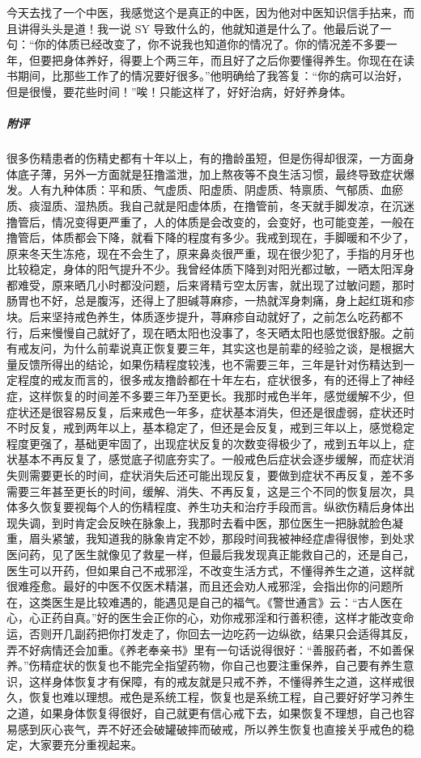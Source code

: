 \begin{case}
    今天去找了一个中医，我感觉这个是真正的中医，因为他对中医知识信手拈来，而且讲得头头是道！我一说 SY 导致什么的，他就知道是什么了。他最后说了一句：“你的体质已经改变了，你不说我也知道你的情况了。你的情况差不多要一年，但要把身体养好，得要上个两三年，而且好了之后你要懂得养生。你现在在读书期间，比那些工作了的情况要好很多。”他明确给了我答复：“你的病可以治好，但是很慢，要花些时间！”唉！只能这样了，好好治病，好好养身体。
    \subparagraph{附评} 很多伤精患者的伤精史都有十年以上，有的撸龄虽短，但是伤得却很深，一方面身体底子薄，另外一方面就是狂撸滥泄，加上熬夜等不良生活习惯，最终导致症状爆发。人有九种体质：平和质、气虚质、阳虚质、阴虚质、特禀质、气郁质、血瘀质、痰湿质、湿热质。我自己就是阳虚体质，在撸管前，冬天就手脚发凉，在沉迷撸管后，情况变得更严重了，人的体质是会改变的，会变好，也可能变差，一般在撸管后，体质都会下降，就看下降的程度有多少。我戒到现在，手脚暖和不少了，原来冬天生冻疮，现在不会生了，原来鼻炎很严重，现在很少犯了，手指的月牙也比较稳定，身体的阳气提升不少。我曾经体质下降到对阳光都过敏，一晒太阳浑身都难受，原来晒几小时都没问题，后来肾精亏空太厉害，就出现了过敏问题，那时肠胃也不好，总是腹泻，还得上了胆碱荨麻疹，一热就浑身刺痛，身上起红斑和疹块。后来坚持戒色养生，体质逐步提升，荨麻疹自动就好了，之前怎么吃药都不行，后来慢慢自己就好了，现在晒太阳也没事了，冬天晒太阳也感觉很舒服。之前有戒友问，为什么前辈说真正恢复要三年，其实这也是前辈的经验之谈，是根据大量反馈所得出的结论，如果伤精程度较浅，也不需要三年，三年是针对伤精达到一定程度的戒友而言的，很多戒友撸龄都在十年左右，症状很多，有的还得上了神经症，这样恢复的时间差不多要三年乃至更长。我那时戒色半年，感觉缓解不少，但症状还是很容易反复，后来戒色一年多，症状基本消失，但还是很虚弱，症状还时不时反复，戒到两年以上，基本稳定了，但还是会反复，戒到三年以上，感觉稳定程度更强了，基础更牢固了，出现症状反复的次数变得极少了，戒到五年以上，症状基本不再反复了，感觉底子彻底夯实了。一般戒色后症状会逐步缓解，而症状消失则需要更长的时间，症状消失后还可能出现反复，要做到症状不再反复，差不多需要三年甚至更长的时间，缓解、消失、不再反复，这是三个不同的恢复层次，具体多久恢复要视每个人的伤精程度、养生功夫和治疗手段而言。纵欲伤精后身体出现失调，到时肯定会反映在脉象上，我那时去看中医，那位医生一把脉就脸色凝重，眉头紧皱，我知道我的脉象肯定不妙，那段时间我被神经症虐得很惨，到处求医问药，见了医生就像见了救星一样，但最后我发现真正能救自己的，还是自己，医生可以开药，但如果自己不戒邪淫，不改变生活方式，不懂得养生之道，这样就很难痊愈。最好的中医不仅医术精湛，而且还会劝人戒邪淫，会指出你的问题所在，这类医生是比较难遇的，能遇见是自己的福气。《警世通言》云：“古人医在心，心正药自真。”好的医生会正你的心，劝你戒邪淫和行善积德，这样才能改变命运，否则开几副药把你打发走了，你回去一边吃药一边纵欲，结果只会适得其反，弄不好病情还会加重。《养老奉亲书》里有一句话说得很好：“善服药者，不如善保养。”伤精症状的恢复也不能完全指望药物，你自己也要注重保养，自己要有养生意识，这样身体恢复才有保障，有的戒友就是只戒不养，不懂得养生之道，这样戒很久，恢复也难以理想。戒色是系统工程，恢复也是系统工程，自己要好好学习养生之道，如果身体恢复得很好，自己就更有信心戒下去，如果恢复不理想，自己也容易感到灰心丧气，弄不好还会破罐破摔而破戒，所以养生恢复也直接关乎戒色的稳定，大家要充分重视起来。
\end{case}


